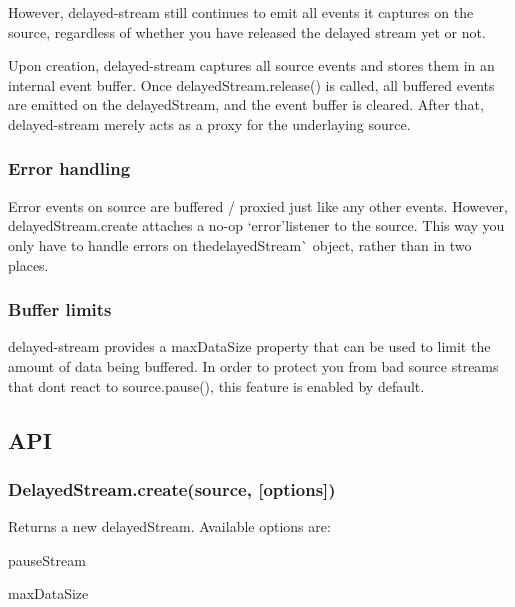 However, delayed-\/stream still continues to emit all events it captures on the {\ttfamily source}, regardless of whether you have released the delayed stream yet or not.

Upon creation, delayed-\/stream captures all {\ttfamily source} events and stores them in an internal event buffer. Once {\ttfamily delayed\+Stream.\+release()} is called, all buffered events are emitted on the {\ttfamily delayed\+Stream}, and the event buffer is cleared. After that, delayed-\/stream merely acts as a proxy for the underlaying source.

\subsubsection*{Error handling}

Error events on {\ttfamily source} are buffered / proxied just like any other events. However, {\ttfamily delayed\+Stream.\+create} attaches a no-\/op `\textquotesingle{}error'{\ttfamily listener to the }source{\ttfamily . This way you only have to handle errors on the}delayed\+Stream\`{} object, rather than in two places.

\subsubsection*{Buffer limits}

delayed-\/stream provides a {\ttfamily max\+Data\+Size} property that can be used to limit the amount of data being buffered. In order to protect you from bad {\ttfamily source} streams that don\textquotesingle{}t react to {\ttfamily source.\+pause()}, this feature is enabled by default.

\subsection*{A\+PI}

\subsubsection*{Delayed\+Stream.\+create(source, \mbox{[}options\mbox{]})}

Returns a new {\ttfamily delayed\+Stream}. Available options are\+:


\begin{DoxyItemize}
\item {\ttfamily pause\+Stream}
\item {\ttfamily max\+Data\+Size}
\end{DoxyItemize}

